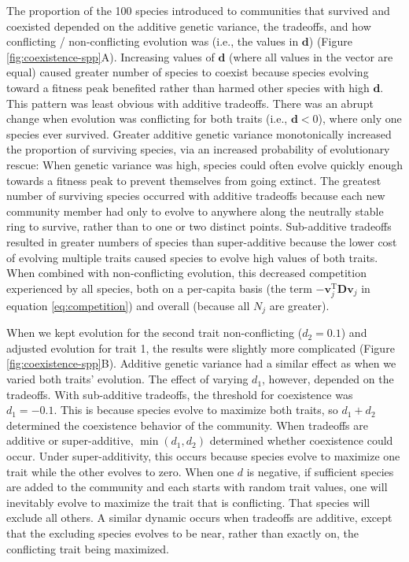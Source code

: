 The proportion of the 100 species introduced to communities that survived and
coexisted depended on the additive genetic variance, 
the tradeoffs, and
how conflicting / non-conflicting evolution was (i.e., the values in $\mathbf{d}$)
(Figure \ref{fig:coexistence-spp}A).
Increasing values of $\mathbf{d}$ (where all values in the vector are equal)
caused greater number of species to coexist
because species evolving toward a fitness peak benefited rather than 
harmed other species with high $\mathbf{d}$.
This pattern was least obvious with additive tradeoffs.
There was an abrupt change when evolution was conflicting for both traits 
(i.e., $\mathbf{d} < 0$), where only one species ever survived.
Greater additive genetic variance monotonically increased the proportion of 
surviving species, via an increased probability 
of evolutionary rescue: When genetic variance was high, 
species could often evolve quickly enough towards a 
fitness peak to prevent themselves from going extinct.
The greatest number of surviving species occurred with additive tradeoffs
because each new community member had only to evolve to anywhere along the
neutrally stable ring to survive, rather than to one or two distinct points.
Sub-additive tradeoffs resulted in greater numbers of species than super-additive
because the lower cost of evolving multiple traits caused species to evolve
high values of both traits.
When combined with non-conflicting evolution,
this decreased competition experienced by all species, both on a 
per-capita basis (the term $- \mathbf{v}_{j}^{\text{T}} \mathbf{D} \mathbf{v}_j$ 
in equation \ref{eq:competition})
and overall (because all $N_j$ are greater).



When we kept evolution for the second trait non-conflicting ($d_2 = 0.1$) and
adjusted evolution for trait 1, the results were slightly more complicated
(Figure \ref{fig:coexistence-spp}B).
Additive genetic variance had a similar effect as when we varied both traits' evolution.
The effect of varying $d_1$, however, depended on the tradeoffs.
With sub-additive tradeoffs, the threshold for coexistence was $d_1 = -0.1$.
This is because species evolve to maximize both traits, so $d_1 + d_2$
determined the coexistence behavior of the community.
When tradeoffs are additive or super-additive, $\min (d_1, d_2)$ determined whether 
coexistence could occur.
Under super-additivity, this occurs because species evolve to maximize one trait while
the other evolves to zero.
When one $d$ is negative, if sufficient species are added to the community and 
each starts with random trait values, 
one will inevitably evolve to maximize the trait that is conflicting. 
That species will exclude all others.
A similar dynamic occurs when tradeoffs are additive, except that
the excluding species evolves to be near, rather than exactly on, 
the conflicting trait being maximized.


